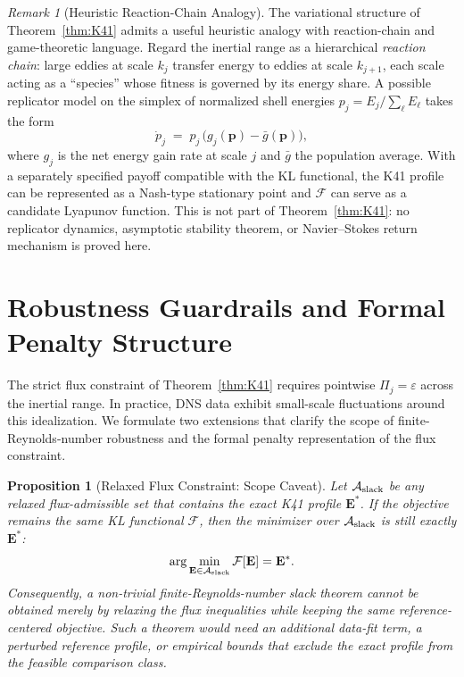 \documentclass[12pt,a4paper]{article}
\theoremstyle{definition}
\theoremstyle{plain}
\newtheorem{proposition}[definition]{Proposition}
\theoremstyle{remark}
\newtheorem{remark}[definition]{Remark}
\begin{document}
\begin{remark}[Heuristic Reaction-Chain Analogy]\label{rem:nash}
The variational structure of Theorem~\ref{thm:K41} admits a useful
heuristic analogy with reaction-chain and game-theoretic language.  Regard
the inertial range as a hierarchical \emph{reaction chain}: large eddies at
scale $k_j$ transfer energy to eddies at scale $k_{j+1}$, each scale acting
as a ``species'' whose fitness is governed by its energy share.  A possible
replicator model on the simplex of normalized shell energies
$p_j = E_j / \sum_\ell E_\ell$ takes the form
\[
  \dot{p}_j
  \;=\;
  p_j\,\bigl(g_j(\mathbf{p}) - \bar{g}(\mathbf{p})\bigr),
\]
where $g_j$ is the net energy gain rate at scale $j$ and $\bar{g}$ the
population average.  With a separately specified payoff compatible with
the KL functional, the K41 profile can be represented as a Nash-type
stationary point and $\mathcal{F}$ can serve as a candidate Lyapunov
function.  This is not part of Theorem~\ref{thm:K41}: no replicator
dynamics, asymptotic stability theorem, or Navier--Stokes return mechanism
is proved here.
\end{remark}

\section{Robustness Guardrails and Formal Penalty Structure}\label{sec:robustness}

The strict flux constraint of Theorem~\ref{thm:K41} requires
pointwise $\Pi_j = \varepsilon$ across the inertial range.
In practice, DNS data exhibit small-scale
fluctuations around this idealization.  We formulate two extensions
  that clarify the scope of finite-Reynolds-number robustness and the
  formal penalty representation of the flux constraint.

\begin{proposition}[Relaxed Flux Constraint: Scope Caveat]
\label{prop:dfc-slack}
Let $\mathcal{A}_{\textup{slack}}$ be any relaxed flux-admissible set that
contains the exact K41 profile $\mathbf{E}^*$.  If the objective remains
the same KL functional $\mathcal{F}$, then the minimizer over
$\mathcal{A}_{\textup{slack}}$ is still exactly $\mathbf{E}^*$:
\begin{equation}\label{eq:dfc-slack-bound}
  \arg\min_{\mathbf{E}\in\mathcal{A}_{\textup{slack}}} \mathcal{F}[\mathbf{E}]
  = \mathbf{E}^*.
\end{equation}
Consequently, a non-trivial finite-Reynolds-number slack theorem cannot be
obtained merely by relaxing the flux inequalities while keeping the same
reference-centered objective.  Such a theorem would need an additional
data-fit term, a perturbed reference profile, or empirical bounds that
exclude the exact profile from the feasible comparison class.
\end{proposition}
\end{document}
